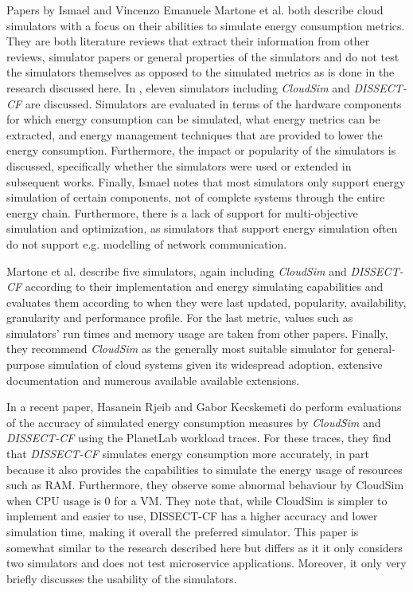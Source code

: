 Papers by Ismael \cite{ismail_energy-driven_2020} and  Vincenzo Emanuele Martone et al. \cite{martone_evaluation_2023} both describe cloud simulators with a focus on their abilities to simulate energy consumption metrics. They are both literature reviews that extract their information from other reviews, simulator papers or general properties of the simulators and do not test the simulators themselves as opposed to the simulated metrics as is done in the research discussed here. In \cite{ismail_energy-driven_2020}, eleven simulators including \textit{CloudSim} and \textit{DISSECT-CF} are discussed. Simulators are evaluated in terms of the hardware components for which energy consumption can be simulated, what energy metrics can be extracted, and energy management techniques that are provided to lower the energy consumption. Furthermore, the impact or popularity of the simulators is discussed, specifically whether the simulators were used or extended in subsequent works. Finally, Ismael \cite{ismail_energy-driven_2020} notes that most simulators only support energy simulation of certain components, not of complete systems through the entire energy chain. Furthermore, there is a lack of support for multi-objective simulation and optimization, as simulators that support energy simulation often do not support e.g. modelling of network communication.

Martone et al. \cite{martone_evaluation_2023} describe five simulators, again including \textit{CloudSim} and \textit{DISSECT-CF} according to their implementation and energy simulating capabilities and evaluates them according to when they were last updated, popularity, availability, granularity and performance profile. For the last metric, values such as simulators' run times and memory usage are taken from other papers. Finally, they recommend \textit{CloudSim} as the generally most suitable simulator for general-purpose simulation of cloud systems given its widespread adoption, extensive documentation and numerous available available extensions.

In a recent paper, Hasanein Rjeib and Gabor Kecskemeti \cite{rjeib_towards_2025} do perform evaluations of the accuracy of simulated energy consumption measures by \textit{CloudSim} and \textit{DISSECT-CF} using the PlanetLab workload traces. For these traces, they find that \textit{DISSECT-CF} simulates energy consumption more accurately, in part because it also provides the capabilities to simulate the energy usage of resources such as RAM. Furthermore, they observe some abnormal behaviour by CloudSim when CPU usage is 0 for a VM. They note that, while CloudSim is simpler to implement and easier to use, DISSECT-CF has a higher accuracy and lower simulation time, making it overall the preferred simulator. This paper is somewhat similar to the research described here but differs as it it only considers two simulators and does not test microservice applications. Moreover, it only very briefly discusses the usability of the simulators.

